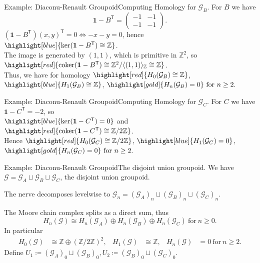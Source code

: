 \documentclass[aspectratio=169]{beamer}
\newcommand{\G}{\mathcal{G}}
\begin{document}
\begin{frame}{Example: Diaconu-Renault Groupoid}{Computing Homology for $\G_B$.}
  For \(B\) we have
  \[
    \mathbf{1}-B^{\mathsf T}=
    \begin{pmatrix}-1&-1\\[2pt]-1&-1\end{pmatrix}.
  \]
  \((\mathbf{1}-B^{\mathsf T})(x,y)^{\mathsf T}=0 \Leftrightarrow -x-y=0\), hence \(\highlight[blue]{\ker(\mathbf{1}-B^{\mathsf T})\cong\mathbb Z}\).\\
  The image is generated by \((1,1)\), which is primitive in \(\mathbb Z^2\), so \(\highlight[red]{\operatorname{coker}(\mathbf{1}-B^{\mathsf T})\cong \mathbb Z^2/\langle(1,1)\rangle_{\mathbb Z}\cong\mathbb Z}\).\\[0.2cm]

  Thus, we have for homology \(\highlight[red]{H_0(\mathcal G_B) \cong \mathbb Z}\), \(\highlight[blue]{H_1(\mathcal G_B) \cong \mathbb Z}\), \(\highlight[gold]{H_n(\mathcal G_B) = 0} \ \text{for}\ n\ge 2.\)
\end{frame}

\begin{frame}{Example: Diaconu-Renault Groupoid}{Computing Homology for $\G_C$.}
  For \(C\) we have \(\mathbf{1}-C^{\mathsf T}=-2\), so\\
  \(\highlight[blue]{\ker(\mathbf{1}-C^{\mathsf T})=0}\) and \(\highlight[red]{\operatorname{coker}(\mathbf{1}-C^{\mathsf T})\cong \mathbb Z/2\mathbb Z}\).\\[0.2cm]

  Hence \(\highlight[red]{H_0(\mathcal G_C) \cong \mathbb Z/2\mathbb Z}\), \(\highlight[blue]{H_1(\mathcal G_C) = 0}\), \(\highlight[gold]{H_n(\mathcal G_C) = 0} \ \text{for}\ n\ge 2.\)
\end{frame}

\begin{frame}{Example: Diaconu-Renault Groupoid}{The disjoint union groupoid.}
We have $\G = \G_A \sqcup \G_B \sqcup \G_C$, the disjoint union groupoid.

The nerve decomposes levelwise to $\G_n = (\G_A)_n \sqcup (\G_B)_n \sqcup (\G_C)_n$.

The Moore chain complex splits as a direct sum, thus
\[
H_n(\mathcal G)\cong H_n(\mathcal G_A)\oplus H_n(\mathcal G_B)\oplus H_n(\mathcal G_C)
\ \text{for} \ n\ge 0.
\]
In particular
\[
\begin{aligned}
H_0(\mathcal G) &\cong \mathbb Z\oplus (\mathbb{Z}/2\mathbb{Z})^2, & H_1(\mathcal G) &\cong \mathbb Z, & H_n(\mathcal G) &= 0\ \text{for} \ n\ge 2.
\end{aligned}
\]
Define
\(
U_1 \coloneqq (\mathcal G_A)_0\sqcup(\mathcal G_B)_0, U_2 \coloneqq (\mathcal G_B)_0\sqcup(\mathcal G_C)_0.
\)
\end{frame}
\end{document}
